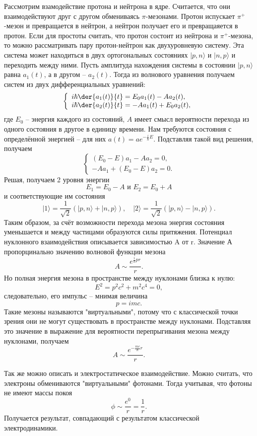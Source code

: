 \newcommand{\bra}[1]{\ensuremath{\langle#1|}}
\newcommand{\ket}[1]{\ensuremath{|#1\rangle}}
Рассмотрим взамодействие протона и нейтрона в ядре. Считается, что они
взаимодействуют друг с другом обмениваясь \( \pi \)-мезонами. Протон испускает
\( \pi^+ \)-мезон и превращается в нейтрон, а нейтрон получает его и
превращаяется в протон. Если для простоты считать, что протон состоит из
нейтрона и \( \pi^+ \)-мезона, то можно рассматривать пару протон-нейтрон как
двухуровневую систему.
Эта система может находиться в двух ортогональных состояниях
\ket{p,n}  и \ket{n,p} и переходить между ними. Пусть амплитуда нахождения
системы в состоянии \ket{p,n} равна \( a_1(t) \), а в другом -- \( a_2(t) \).
Тогда из волнового уравнения получаем систем из двух дифференциальных уравнений:
\[
    \left\{
        \begin{array}{l}
            i\hbar\der{a_1(t)}{t} = E_0 a_1(t) - A a_2(t),\\
            i\hbar\der{a_2(t)}{t} = - A a_1(t) + E_0 a_2(t),
        \end{array}
    \right.
\]
где \( E_0 \) -- энергия каждого из состояний, \( A \) имеет смысл вероятности
перехода из одного состояния в другое в единицу времени. Нам требуются состояния
с определённой энергией -- для них \( a(t)  = ae^{-\frac{i}{\hbar}E} \).
Подставляя такой вид решения, получаем
\[
    \left\{
        \begin{array}{l}
            (E_0-E) a_1 - A a_2 = 0,\\
            - A a_1 + (E_0-E) a_2 = 0.
        \end{array}
    \right.
\]
Решая, получаем 2 уровня энергии
\[
    E_1 = E_0 - A \text{ и } E_2 = E_0 + A
\]
и соответствующие им состояния
\[
    \ket{1} = \frac{1}{\sqrt{2}}(\ket{p,n} + \ket{n,p}),\quad
    \ket{2} = \frac{1}{\sqrt{2}}(\ket{p,n} - \ket{n,p}).
\]
Таким образом, за счёт возможности перехода мезона энергия состояния уменьшается
и между частицами образуются силы притяжения. Потенциал нуклонного
взаимодействия описывается зависимостью A от r. Значение А пропорцинально
значению волновой функции мезона
\[
    A \sim \frac{e^{\frac{i}{\hbar}pr}}{r}.
\]
Но полная энергия мезона в пространстве между нуклонами близка к нулю:
\[
    E^2 = p^2c^2 + m^2c^4 = 0,
\]
следовательно, его импульс -- мнимая величина
\[
    p = imc.
\]
Такие мезоны называются "виртуальными", потому что с классической точки зрения
они не могут существовать в пространстве между нуклонами.
Подставляя это значение в выражение для вероятности перепрыгивания мезона между
нуклонами, получаем
\[
    A \sim \frac{e^{-\frac{mc}{\hbar}r}}{r}.
\]

Так же можно описать и электростатическое взаимодействие. Можно считать, что
электроны обмениваются "виртуальными" фотонами. Тогда учитывая, что фотоны не
имеют массы покоя
\[
    \phi \sim \frac{e^{0}}{r} = \frac{1}{r}.
\]
Получается результат, совпадающий с результатом классической электродинамики.

